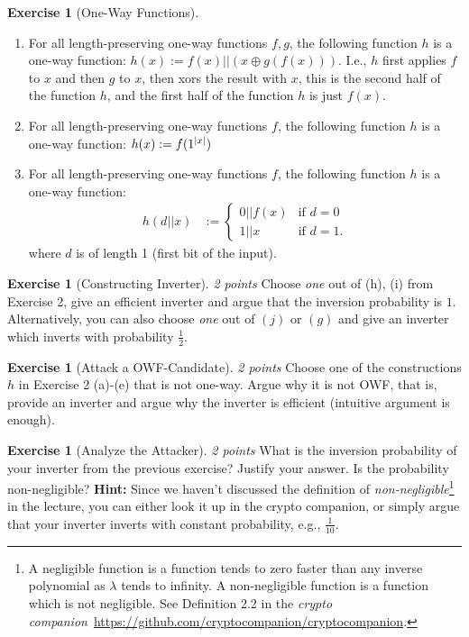 \documentclass[envcountsame,runningheads,notitlepage]{../llncs}
\theoremstyle{definition}
\newtheorem{graded}[crossed]{Exercise}
\begin{document}
\begin{graded}[One-Way Functions]
\begin{enumerate}[label=(\alph*)]
\item \label{itm:f||x xor g(f)} For all length-preserving one-way functions $f, g$, the following function $h$ is a one-way function: $h(x) := f(x) || (x \oplus g(f(x)))$. I.e., $h$ first applies $f$ to $x$ and then $g$ to $x$, then xors the result with $x$, this is the second half of the function $h$, and the first half of the function $h$ is just $f(x)$.
\item \label{itm:f(1)} For all length-preserving one-way functions $f$, the following function $h$ is a one-way function: $h(x) := f(1^{\left\lvert x\right\rvert})$
\item \label{itm:f if first bit} For all length-preserving one-way functions $f$, the following function $h$ is a one-way function:
\begin{align*}
h(d||x) &:= \begin{cases}
    0 || f(x) &  \text{if } d=0\\
    1 || x &               \text{if } d=1.
\end{cases}
\end{align*}
where $d$ is of length 1 (first bit of the input).
\end{enumerate}
\end{graded}


\begin{graded}[Constructing Inverter] \emph{2 points}
Choose \emph{one} out of (h), (i) from Exercise 2, give an efficient inverter and argue that
the inversion probability is $1$. Alternatively, you can also choose \emph{one} out of $(j)$ or $(g)$ and give an inverter which
inverts with probability $\tfrac{1}{2}$.
\end{graded}

\begin{graded}[Attack a OWF-Candidate] \emph{2 points}
Choose one of the constructions $h$ in Exercise 2 (a)-(e) that is not one-way. Argue why it is not OWF, that is, provide an inverter and argue why the inverter is efficient (intuitive argument is enough).
\end{graded}

\begin{graded}[Analyze the Attacker] \emph{2 points}
What is the inversion probability of your inverter from the previous exercise? Justify your answer. Is the probability non-negligible?
\textbf{Hint:} Since we haven't discussed the definition of \emph{non-negligible}\footnote{A negligible function is a function tends to zero faster than any inverse polynomial as $\lambda$ tends to infinity. A non-negligible function is a function which is not negligible. See Definition 2.2 in the \emph{crypto companion}~\url{https://github.com/cryptocompanion/cryptocompanion}.} in the lecture, you can either look it up in the crypto companion, or simply argue that your inverter inverts with constant probability, e.g., $\tfrac{1}{10}$.
\end{graded}
\end{document}
